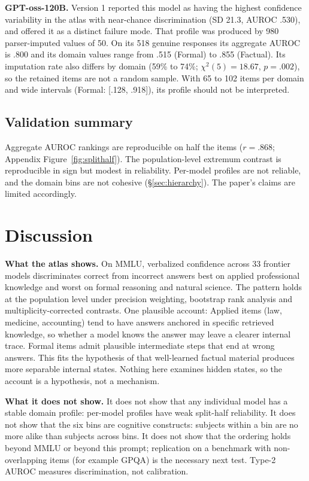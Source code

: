 \textbf{GPT-oss-120B.} Version 1 reported this model as having the highest confidence variability in the atlas with near-chance discrimination (SD 21.3, AUROC .530), and offered it as a distinct failure mode. That profile was produced by 980 parser-imputed values of 50. On its 518 genuine responses its aggregate AUROC is .800 and its domain values range from .515 (Formal) to .855 (Factual). Its imputation rate also differs by domain (59\% to 74\%; $\chi^2(5) = 18.67$, $p = .002$), so the retained items are not a random sample. With 65 to 102 items per domain and wide intervals (Formal: [.128, .918]), its profile should not be interpreted.

\subsection{Validation summary}
\label{sec:coherence}

Aggregate AUROC rankings are reproducible on half the items ($r = .868$; Appendix Figure~\ref{fig:splithalf}). The population-level extremum contrast is reproducible in sign but modest in reliability. Per-model profiles are not reliable, and the domain bins are not cohesive (\S\ref{sec:hierarchy}). The paper's claims are limited accordingly.

\section{Discussion}

\textbf{What the atlas shows.} On MMLU, verbalized confidence across 33 frontier models discriminates correct from incorrect answers best on applied professional knowledge and worst on formal reasoning and natural science. The pattern holds at the population level under precision weighting, bootstrap rank analysis and multiplicity-corrected contrasts. One plausible account: Applied items (law, medicine, accounting) tend to have answers anchored in specific retrieved knowledge, so whether a model knows the answer may leave a clearer internal trace. Formal items admit plausible intermediate steps that end at wrong answers. This fits the hypothesis of \citet{kim2026} that well-learned factual material produces more separable internal states. Nothing here examines hidden states, so the account is a hypothesis, not a mechanism.

\textbf{What it does not show.} It does not show that any individual model has a stable domain profile: per-model profiles have weak split-half reliability. It does not show that the six bins are cognitive constructs: subjects within a bin are no more alike than subjects across bins. It does not show that the ordering holds beyond MMLU or beyond this prompt; replication on a benchmark with non-overlapping items (for example GPQA) is the necessary next test. Type-2 AUROC measures discrimination, not calibration.

